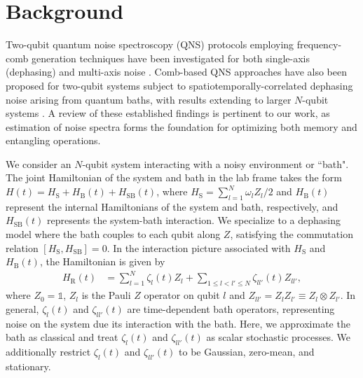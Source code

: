 \documentclass[%
 reprint,
superscriptaddress,
 amsmath,amssymb,
 aps,
pra,
floatfix,
]{revtex4-2}
\begin{document}
\section{Background}
\label{sec::background}
Two-qubit quantum noise spectroscopy (QNS) protocols employing frequency-comb generation techniques have been investigated for both single-axis (dephasing) and multi-axis noise \cite{PhysRevA.94.012109, PhysRevLett.107.230501, CombMultiaxis, PhysRevA.95.022121}. Comb-based QNS approaches have also been proposed for two-qubit systems subject to spatiotemporally-correlated dephasing noise arising from quantum baths, with results extending to larger $N$-qubit systems \cite{PhysRevA.95.022121}. A review of these established findings is pertinent to our work, as estimation of noise spectra forms the foundation for optimizing both memory and entangling operations.

We consider an $N$-qubit system interacting with a noisy environment or ``bath". The joint Hamiltonian of the system and bath in the lab frame takes the form $H(t)=H_\text{S}+H_\text{B}(t)+H_\text{SB}(t)$, where $H_\text{S}=\sum_{l=1}^N\omega_l Z_l/2$ and $H_\text{B}(t)$ represent the internal Hamiltonians of the system and bath, respectively, and $H_\text{SB}(t)$ represents the system-bath interaction. We specialize to a dephasing model where the bath couples to each qubit along $Z$, satisfying the commutation relation $[H_\text{S},H_\text{SB}]=0$. In the interaction picture associated with $H_\text{S}$ and $H_\text{B}(t)$, the Hamiltonian is given by
\begin{align}
    H_\text{R}(t)&=\sum_{l=1}^N \zeta_l(t) Z_l + \sum_{1\leq l <l'\leq N} \zeta_{ll'}(t) Z_{ll'},
\end{align}
where $Z_0=\mathbb{1}$, $Z_l$ is the Pauli $Z$ operator on qubit $l$ and $Z_{ll'}=Z_lZ_{l'}\equiv Z_l\otimes Z_{l'}$.
In general, $\zeta_l(t)$ and $\zeta_{ll'}(t)$ are time-dependent bath operators, representing noise on the system due its interaction with the bath. Here, we approximate the bath as classical and treat $\zeta_l(t)$ and $\zeta_{ll'}(t)$ as scalar stochastic processes. We additionally restrict $\zeta_l(t)$ and $\zeta_{ll'}(t)$ to be Gaussian, zero-mean, and stationary.
\end{document}
